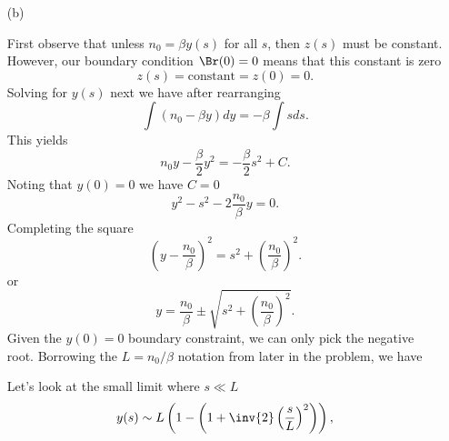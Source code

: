 {\begin{enumerate}
We have two non-trivial differential equations to solve.

\item[(b)]

First observe that unless \(n_0 = \beta y(s)\) for all \(s\), then \(z(s)\) must be constant.  However, our boundary condition \(\Br(0) = 0\) means that this constant is zero
%
\begin{equation}\label{eqn:modernOpticsProblemSet1P2:110}
z(s) = \text{constant} = z(0) = 0.
\end{equation}
%
Solving for \(y(s)\) next we have after rearranging
%
\begin{equation}\label{eqn:modernOpticsProblemSet1P2:130}
\int \left( n_0 - \beta y \right) dy = -\beta \int s ds.
\end{equation}
%
This yields
%
\begin{equation}\label{eqn:modernOpticsProblemSet1P2:150}
n_0 y - \frac{\beta}{2} y^2 = -\frac{\beta}{2} s^2 + C.
\end{equation}
%
Noting that \(y(0) = 0\) we have \(C = 0\)
%
\begin{equation}\label{eqn:modernOpticsProblemSet1P2:170}
y^2 - s^2 - 2 \frac{n_0}{\beta} y = 0.
\end{equation}
%
Completing the square
%
\begin{equation}\label{eqn:modernOpticsProblemSet1P2:230}
\left( y - \frac{n_0}{\beta} \right)^2 = s^2 + \left( \frac{n_0}{\beta} \right)^2.
\end{equation}
%
or
%
\begin{equation}\label{eqn:modernOpticsProblemSet1P2:190}
y = \frac{n_0}{\beta} \pm \sqrt{ s^2 + \left( \frac{n_0}{\beta} \right)^2 }.
\end{equation}
%
Given the \(y(0) = 0\) boundary constraint, we can only pick the negative root.  Borrowing the \(L = n_0/\beta\) notation from later in the problem, we have

Let's look at the small limit where \(s \ll L\)
%
\begin{equation}\label{eqn:modernOpticsProblemSet1P2:250}
y(s)
\sim L \left( 1 - \left( 1 + \inv{2} \left(\frac{s}{L}\right)^2 \right) \right),
\end{equation}
%


\end{enumerate}}
